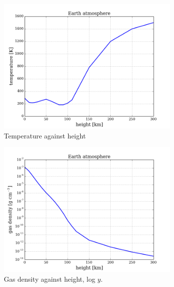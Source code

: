 \documentclass{article}
\begin{document}
\begin{figure}[H]
  \centering
  \begin{subfigure}{0.49\textwidth}
    \includegraphics[scale=0.37]{../figures/earth/earth_h_temp.png}
    \caption{Temperature against height}
  \end{subfigure}
  \begin{subfigure}{0.49\textwidth}
    \includegraphics[scale=0.37]{../figures/earth/earth_h_rho.png}
    \caption{Gas density against height, log $y$.}
  \end{subfigure}
  \\
  \begin{subfigure}{0.49\textwidth}

\end{subfigure}
\end{figure}
\end{document}
